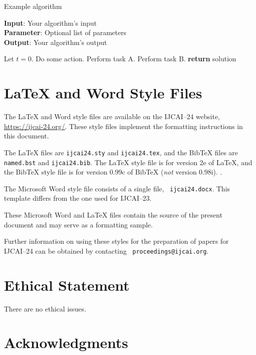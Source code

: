 \documentclass{article}
\begin{document}
\begin{algorithm}[tb]
    \caption{Example algorithm}
    \label{alg:algorithm}
    \textbf{Input}: Your algorithm's input\\
    \textbf{Parameter}: Optional list of parameters\\
    \textbf{Output}: Your algorithm's output
    \begin{algorithmic}[1] %
        \STATE Let $t=0$.
        \STATE Do some action.
        \STATE Perform task A.
        \ELSE
        \STATE Perform task B.
        \ENDIF
        \ENDWHILE
        \STATE \textbf{return} solution
    \end{algorithmic}
\end{algorithm}

\section{\LaTeX{} and Word Style Files}\label{stylefiles}

The \LaTeX{} and Word style files are available on the IJCAI--24
website, \url{https://ijcai-24.org/}.
These style files implement the formatting instructions in this
document.

The \LaTeX{} files are {\tt ijcai24.sty} and {\tt ijcai24.tex}, and
the Bib\TeX{} files are {\tt named.bst} and {\tt ijcai24.bib}. The
\LaTeX{} style file is for version 2e of \LaTeX{}, and the Bib\TeX{}
style file is for version 0.99c of Bib\TeX{} ({\em not} version
0.98i). .

The Microsoft Word style file consists of a single file, {\tt
        ijcai24.docx}. This template differs from the one used for
IJCAI--23.

These Microsoft Word and \LaTeX{} files contain the source of the
present document and may serve as a formatting sample.

Further information on using these styles for the preparation of
papers for IJCAI--24 can be obtained by contacting {\tt
        proceedings@ijcai.org}.

\appendix

\section*{Ethical Statement}

There are no ethical issues.

\section*{Acknowledgments}
\end{document}
